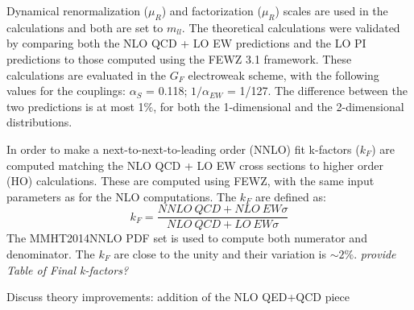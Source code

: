 Dynamical renormalization ($\mu_{R}$) and factorization ($\mu_{R}$) scales are used in the calculations 
and both are set to $m_{ll}$. The theoretical calculations were validated by comparing both the NLO QCD + LO EW predictions and the 
LO PI predictions to those computed using the FEWZ 3.1 framework. These calculations are evaluated in the $G_{F}$ electroweak scheme, with the following values for the couplings:
 $\alpha_{S}$ = 0.118; $1/\alpha_{EW}$ = 1/127. The difference between the two predictions is at most 1${\%}$, for both the 1-dimensional and the 2-dimensional distributions.

In order to make a next-to-next-to-leading order (NNLO) fit k-factors ($k_{F}$) are computed matching
 the NLO QCD + LO EW cross sections to higher order (HO) calculations. These are computed using 
FEWZ, with the same input parameters as for the NLO computations. The $k_{F}$ are defined as:
\begin{equation}
k_{F}=\frac{NNLO\  QCD  + NLO\  EW \sigma}{NLO\  QCD + LO\  EW \sigma}
\end{equation}
The MMHT2014NNLO PDF set is used to compute both numerator and denominator.
 The $k_{F}$ are close to the unity and their variation is $\sim 2\%$. {\it provide Table of Final k-factors?}


Discuss theory improvements: addition of the NLO QED+QCD piece 

